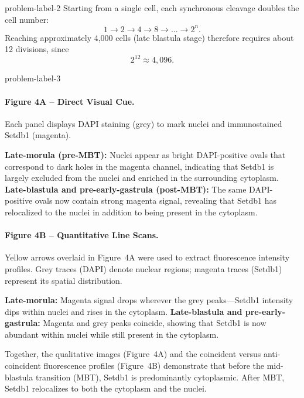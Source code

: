 \begin{multicols}{2}
\begin{problem}{}{problem-label-2}
    Starting from a single cell, each synchronous cleavage doubles the cell number:
    \[
    1 \rightarrow 2 \rightarrow 4 \rightarrow 8 \rightarrow \dots \rightarrow 2^n.
    \]
    Reaching approximately 4,000 cells (late blastula stage) therefore requires about 12 divisions, since
    \[
    2^{12} \approx 4,\!096.
    \]

\end{problem}


\begin{problem}{}{problem-label-3}

    \paragraph{Figure 4A – Direct Visual Cue.}
    Each panel displays DAPI staining (grey) to mark nuclei and immunostained Setdb1 (magenta).
    

\textbf{Late-morula (pre-MBT):} Nuclei appear as bright DAPI-positive ovals that correspond to dark holes in the magenta channel, indicating that Setdb1 is largely excluded from the nuclei and enriched in the surrounding cytoplasm.
\textbf{Late-blastula and pre-early-gastrula (post-MBT):} The same DAPI-positive ovals now contain strong magenta signal, revealing that Setdb1 has relocalized to the nuclei in addition to being present in the cytoplasm.
 
    
    \paragraph{Figure 4B – Quantitative Line Scans.}
    Yellow arrows overlaid in Figure~4A were used to extract fluorescence intensity profiles. Grey traces (DAPI) denote nuclear regions; magenta traces (Setdb1) represent its spatial distribution.
    

 \textbf{Late-morula:} Magenta signal drops wherever the grey peaks—Setdb1 intensity dips within nuclei and rises in the cytoplasm.
 \textbf{Late-blastula and pre-early-gastrula:} Magenta and grey peaks coincide, showing that Setdb1 is now abundant within nuclei while still present in the cytoplasm.

    
    \noindent
    Together, the qualitative images (Figure~4A) and the coincident versus anti-coincident fluorescence profiles (Figure~4B) demonstrate that before the mid-blastula transition (MBT), Setdb1 is predominantly cytoplasmic. After MBT, Setdb1 relocalizes to both the cytoplasm and the nuclei.
    
\end{problem}


\end{multicols}









